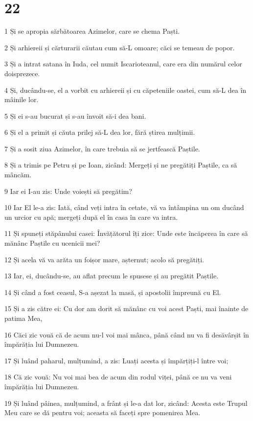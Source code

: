\chapter{22}

\par 1 Și se apropia sărbătoarea Azimelor, care se chema Paști.
\par 2 Și arhiereii și cărturarii căutau cum să-L omoare; căci se temeau de popor.
\par 3 Și a intrat satana în Iuda, cel numit Iscarioteanul, care era din numărul celor doisprezece.
\par 4 Și, ducându-se, el a vorbit cu arhiereii și cu căpeteniile oastei, cum să-L dea în mâinile lor.
\par 5 Și ei s-au bucurat și s-au învoit să-i dea bani.
\par 6 Și el a primit și căuta prilej să-L dea lor, fără știrea mulțimii.
\par 7 Și a sosit ziua Azimelor, în care trebuia să se jertfească Paștile.
\par 8 Și a trimis pe Petru și pe Ioan, zicând: Mergeți și ne pregătiți Paștile, ca să mâncăm.
\par 9 Iar ei I-au zis: Unde voiești să pregătim?
\par 10 Iar El le-a zis: Iată, când veți intra în cetate, vă va întâmpina un om ducând un urcior cu apă; mergeți după el în casa în care va intra.
\par 11 Și spuneți stăpânului casei: Învățătorul îți zice: Unde este încăperea în care să mănânc Paștile cu ucenicii mei?
\par 12 Și acela vă va arăta un foișor mare, așternut; acolo să pregătiți.
\par 13 Iar, ei, ducându-se, au aflat precum le spusese și au pregătit Paștile.
\par 14 Și când a fost ceasul, S-a așezat la masă, și apostolii împreună cu El.
\par 15 Și a zis către ei: Cu dor am dorit să mănânc cu voi acest Paști, mai înainte de patima Mea,
\par 16 Căci zic vouă că de acum nu-l voi mai mânca, până când nu va fi desăvârșit în împărăția lui Dumnezeu.
\par 17 Și luând paharul, mulțumind, a zis: Luați acesta și împărțiți-l între voi;
\par 18 Că zic vouă: Nu voi mai bea de acum din rodul viței, până ce nu va veni împărăția lui Dumnezeu.
\par 19 Și luând pâinea, mulțumind, a frânt și le-a dat lor, zicând: Acesta este Trupul Meu care se dă pentru voi; aceasta să faceți spre pomenirea Mea.
